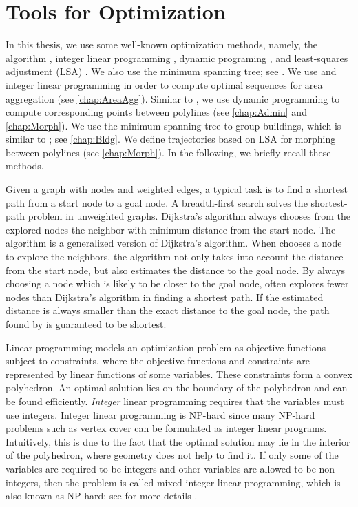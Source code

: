\section{Tools for Optimization}
\label{sec:Intro_Tools}

In this thesis, we use some well-known optimization methods,
namely,
the \Astar algorithm \parencite{Hart1968}, 
integer linear programming
\parencite[chapter~13]{Papadimitriou1982combinatorial},
dynamic programing \parencite[chapter~15]{Cormen2009}, and
least-squares adjustment (LSA) \parencite[chapter~3]{Koch1988}.
We also use the minimum spanning tree;
see \parencite[chapter~23]{Cormen2009}.
%
We use \Astar and integer linear programming in order 
to compute optimal sequences for 
area aggregation (see \chap\ref{chap:AreaAgg}).
Similar to \textcite{Noellenburg2008},
we use dynamic programming to 
compute corresponding points between polylines
(see \chaps\ref{chap:Admin} and \ref{chap:Morph}).
We use the minimum spanning tree to group buildings,
which is similar to \textcite{Regnauld2001}; see \chap\ref{chap:Bldg}.
We define trajectories based on LSA 
for morphing between polylines (see \chap\ref{chap:Morph}).
In the following, we briefly recall these methods.


Given a graph with nodes and weighted edges,
a typical task is to find a shortest path 
from a start node to a goal node.
A breadth-first search \parencite[chapter~22]{Cormen2009}
solves the shortest-path problem 
in unweighted graphs.
Dijkstra's algorithm \parencite{Dijkstra1959}
always chooses 
from the explored nodes the neighbor 
with minimum distance from the start node. 
The \Astar algorithm is 
a generalized version of Dijkstra's algorithm.
When \Astar chooses a node to explore the neighbors,
the algorithm not only takes into account 
the distance from the start node,
but also estimates the distance to the goal node.
By always choosing a node which is likely 
to be closer to the goal node, 
\Astar often explores fewer nodes than Dijkstra's algorithm
in finding a shortest path.
If the estimated distance is always smaller than the exact 
distance to the goal node, 
the path found by \Astar is guaranteed to be shortest.

Linear programming models an optimization problem as objective 
functions subject to constraints,
where the objective functions and constraints are represented by 
linear functions of some variables.
These constraints form a convex polyhedron.
An optimal solution lies on the boundary of the polyhedron and 
can be found efficiently.
\emph{Integer} linear programming requires that
the variables must use integers.
Integer linear programming is NP-hard
since many NP-hard problems such as vertex cover can be 
formulated as integer linear programs.
Intuitively, this is due to the fact that the optimal solution 
may lie in the interior of the polyhedron, where geometry does 
not help to find it.
If only some of the variables are required to be integers
and other variables are allowed to be non-integers, 
then the problem is called mixed integer linear programming,
which is also known as NP-hard; see for more details
\textcite[chapter~16]{Schrijver1986}.



